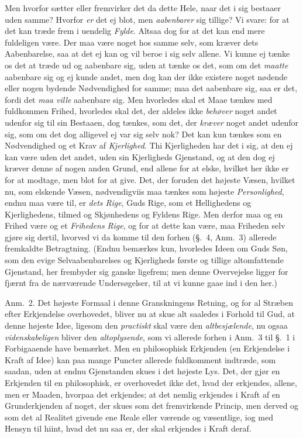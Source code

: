 \documentclass[12pt,a4paper]{book}
\newcommand{\apage}[1]{\marginnote{\footnotesize\textit{[#1]}}}
\begin{document}
Men hvorfor sætter eller fremvirker det da dette Hele, naar det i sig bestaaer
uden samme? Hvorfor \emph{er} det ej blot, men \emph{aabenbarer} sig tillige? Vi svare:
for at det kan træde frem i uendelig \emph{Fylde}. Altsaa dog for at det kan end
mere fuldeligen være. Der maa være noget hos samme selv, som kræver dets
Aabenbarelse, saa at det ej kan og vil beroe i sig selv allene. Vi \apage{110} kunne ej tænke
os det at træde ud og aabenbare sig, uden at tænke os det, som om det \emph{maatte}
aabenbare sig og ej kunde andet, men dog kan der ikke existere noget nødende eller
nogen bydende Nødvendighed for samme; maa det aabenbare sig, saa er det, fordi det
\emph{maa ville} aabenbare sig. Men hvorledes skal et Maae tænkes med fuldkommen
Frihed, hvorledes skal det, der aldeles ikke \emph{behøver} noget andet udenfor
sig til sin Bestaaen, dog tænkes, som det, der \emph{kræver} noget andet udenfor
sig, som om det dog alligevel ej var sig selv nok? Det kan kun tænkes som en
Nødvendighed og et Krav af \emph{Kjerlighed}. Thi Kjerligheden har det i sig, at
den ej kan være uden det andet, uden sin Kjerligheds Gjenstand, og at den dog ej
kræver denne af nogen anden Grund, end allene for at elske, hvilket her ikke er
for at modtage, men blot for at give. Det, der foruden det højeste Væsen, hvilket
nu, som elskende Væsen, nødvendigviis maa tænkes som højeste \emph{Personlighed},
endnu maa være til, er \emph{dets Rige}, Guds Rige, som et Hellighedens og
Kjerlighedens, tilmed og Skjønhedens og Fyldens Rige. Men derfor maa og en
Frihed være og et \emph{Frihedens Rige}, og for at dette kan være, maa
Friheden selv gjøre sig dertil, hvorved vi da komme til den forhen (§.~4, Anm.~3)
allerede fremkaldte Betragtning. (Endnu bemærkes kun, hvorledes Ideen om Guds Søn,
som den evige \apage{111} Selvaabenbarelses og Kjerligheds første og tillige altomfattende
Gjenstand, her frembyder sig ganske ligefrem; men denne Overvejelse ligger for
fjærnt fra de nærværende Undersøgelser, til at vi kunne gaae ind i den her.)

Anm.~2. Det højeste Formaal i denne Granskningens Retning, og for al Stræben efter
Erkjendelse overhovedet, bliver nu at skue alt saaledes i Forhold til Gud, at
denne højeste Idee, ligesom den \emph{practiskt} skal være den \emph{altbesjælende},
nu ogsaa \emph{videnskabeligen} bliver den \emph{altoplysende}, som vi allerede
forhen i Anm.~3 til §.~1 i Forbigaaende have bemærket. Men en philosophisk
Erkjenden (en Erkjendelse i Kraft af Idee) kan paa mange Puncter allerede
fuldkomment indtræde, som saadan, uden at endnu Gjenstanden skues i det højeste
Lys. Det, der gjør en Erkjenden til en philosophisk, er overhovedet ikke det, hvad
der erkjendes, allene, men er Maaden, hvorpaa det erkjendes; at det nemlig
erkjendes i Kraft af en Grunderkjenden af noget, der skues som det fremvirkende
Princip, men derved og som det al Realitet givende ene Reale eller værende og
væsentlige, iog med Hensyn til hiint,%
 hvad det nu saa er, der skal erkjendes i Kraft deraf.
\end{document}
